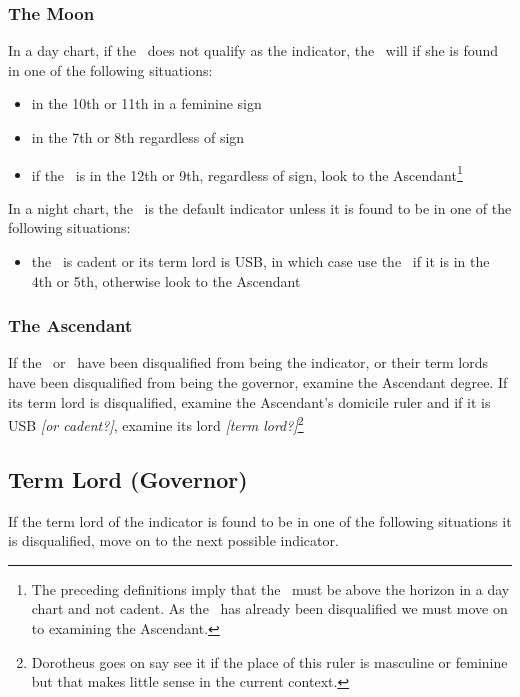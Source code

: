 \subsubsection{The Moon}
\vspace{-0.5em}
In a day chart, if the \Sun\, does not qualify as the indicator, the \Moon\, will if she is found in one of the following situations:
\begin{itemize}[topsep=0em,itemsep=0em]
\item {}in the 10th or 11th in a feminine sign
\item {}in the 7th or 8th regardless of sign
\item if the \Moon\, is in the 12th or 9th, regardless of sign, look to the Ascendant\footnote{The preceding definitions imply that the \Moon\, must be above the horizon in a day chart and not cadent. As the \Sun\, has already been disqualified we must move on to examining the Ascendant.}
\end{itemize}

In a night chart, the \Moon\, is the default indicator unless it is found to be in one of the following situations:
\begin{itemize}[topsep=0em,itemsep=0em]
\item {}the \Moon\, is cadent or its term lord is USB, in which case use the \Sun\, if it is in the 4th or 5th, otherwise look to the Ascendant
\end{itemize}

\subsubsection{The Ascendant}
If the \Sun\, or \Moon\, have been disqualified from being the indicator, or their term lords have been disqualified from being the governor, examine the Ascendant degree. If its term lord is disqualified, examine the Ascendant's domicile ruler and  if it is USB \textsl{[or cadent?]}, examine its lord \textsl{[term lord?]}\footnote{Dorotheus goes on say see it if the place of this ruler is masculine or feminine but that makes little sense in the current context.}

\vspace{-0.5em}
\subsection{Term Lord (Governor)}
If the term lord of the indicator is found to be in one of the following situations  it is disqualified, move on to the next possible indicator.

